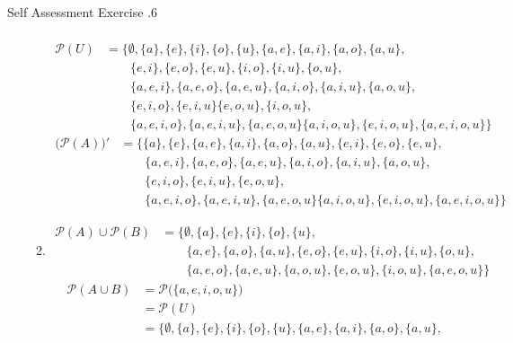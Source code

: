 \documentclass[../notes.tex]{subfiles}
\begin{document}
\begin{exercise}{Self Assessment Exercise \thechapter.6}
\begin{enumerate}
\begin{enumerate}[label=(\alph*)]
\begin{align*}
                \end{align*}
                \begin{align*}
                  \mathcal{P}(U) &= \bigl\{\emptyset, \{a\}, \{e\}, \{i\}, \{o\}, \{u\}, \{a, e\}, \{a, i\}, \{a, o\}, \{a, u\},\\
                  & \qquad \{e, i\}, \{e, o\}, \{e, u\}, \{i, o\}, \{i, u\}, \{o, u\},\\
                  & \qquad \{a, e, i\}, \{a, e, o\}, \{a, e, u\}, \{a, i, o\}, \{a, i, u\}, \{a, o, u\},\\
                  & \qquad \{e, i, o\}, \{e, i, u\} \{e, o, u\}, \{i, o, u\},\\
                  & \qquad \{a, e, i, o\}, \{a, e, i, u\}, \{a, e, o, u\} \{a, i, o, u\}, \{e, i, o, u\}, \{a, e, i, o, u\}\bigr\}
                \end{align*}
                \begin{align*}
                  \bigl(\mathcal{P}(A)\bigr)' &= \bigl\{\{a\}, \{e\}, \{a, e\}, \{a, i\}, \{a, o\}, \{a, u\}, \{e, i\}, \{e, o\}, \{e, u\},\\
                  & \qquad \{a, e, i\}, \{a, e, o\}, \{a, e, u\}, \{a, i, o\}, \{a, i, u\}, \{a, o, u\}, \\
                  & \qquad \{e, i, o\}, \{e, i, u\},  \{e, o, u\}, \\
                  & \qquad \{a, e, i, o\}, \{a, e, i, u\}, \{a, e, o, u\} \{a, i, o, u\}, \{e, i, o, u\}, \{a, e, i, o, u\}\bigr\}
                \end{align*}
              \item \moveup
                \begin{align*}
                  \mathcal{P}(A) \cup \mathcal{P}(B) &= \bigl\{\emptyset, \{a\}, \{e\}, \{i\}, \{o\}, \{u\},\\
                  & \qquad \{a, e\}, \{a, o\}, \{a, u\}, \{e, o\}, \{e, u\}, \{i, o\}, \{i, u\}, \{o, u\}, \\
                  & \qquad \{a, e, o\}, \{a, e, u\}, \{a, o, u\}, \{e, o, u\}, \{i, o, u\}, \{a, e, o, u\}\bigr\}
                \end{align*}
                \begin{align*}
                  \mathcal{P}(A \cup B) &= \mathcal{P}\bigl(\{a, e, i, o, u\}\bigr)\\
                  &= \mathcal{P}(U)\\
                  &= \bigl\{\emptyset, \{a\}, \{e\}, \{i\}, \{o\}, \{u\}, \{a, e\}, \{a, i\}, \{a, o\}, \{a, u\},\\

\end{align*}
\end{enumerate}
\end{enumerate}
\end{exercise}
\end{document}
